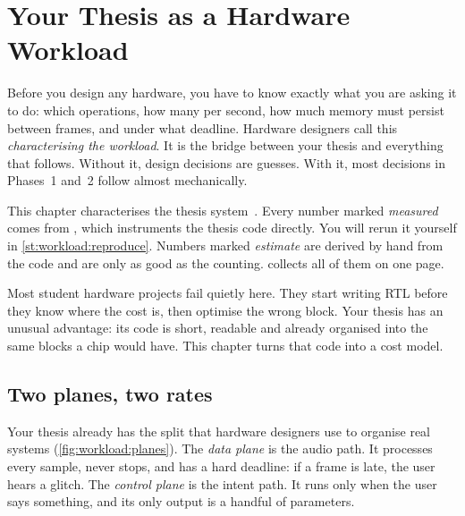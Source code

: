 \chapter{Your Thesis as a Hardware Workload}\label{ch:workload}

Before you design any hardware, you have to know exactly what you are asking it
to do: which operations, how many per second, how much memory must persist
between frames, and under what deadline. Hardware designers call this
\emph{characterising the workload}. It is the bridge between your thesis and
everything that follows. Without it, design decisions are guesses. With it,
most decisions in Phases~1 and~2 follow almost mechanically.

This chapter characterises the thesis system~\cite{burrell2026thesis}. Every
number marked \emph{measured} comes from
, which instruments the
thesis code directly. You will rerun it yourself in \cref{st:workload:reproduce}.
Numbers marked \emph{estimate} are derived by hand from the code and are only as
good as the counting.  collects all of them on one page.

\begin{whybox}
Most student hardware projects fail quietly here. They start writing RTL before
they know where the cost is, then optimise the wrong block. Your thesis has an
unusual advantage: its code is short, readable and already organised into the
same blocks a chip would have. This chapter turns that code into a cost model.
\end{whybox}

\section{Two planes, two rates}\label{sec:workload:planes}

Your thesis already has the split that hardware designers use to organise real
systems (\cref{fig:workload:planes}). The \emph{data plane} is the audio path.
It processes every sample, never stops, and has a hard deadline: if a frame is
late, the user hears a glitch. The \emph{control plane} is the intent path. It
runs only when the user says something, and its only output is a handful of
parameters.

